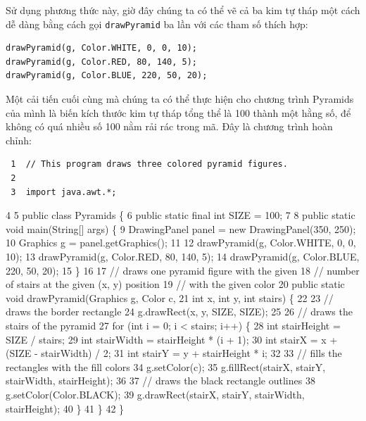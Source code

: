 Sử dụng phương thức này, giờ đây chúng ta có thể vẽ cả ba kim tự tháp
một cách dễ dàng bằng cách gọi \texttt{drawPyramid} ba lần với các tham
số thích hợp:

\begin{verbatim}
drawPyramid(g, Color.WHITE, 0, 0, 10);
drawPyramid(g, Color.RED, 80, 140, 5);
drawPyramid(g, Color.BLUE, 220, 50, 20);
\end{verbatim}

Một cải tiến cuối cùng mà chúng ta có thể thực hiện cho chương trình
Pyramids của mình là biến kích thước kim tự tháp tổng thể là 100 thành
một hằng số, để không có quá nhiều số 100 nằm rải rác trong mã. Đây là
chương trình hoàn chỉnh:

\begin{verbatim}
 1  // This program draws three colored pyramid figures.
 2
 3  import java.awt.*;
\end{verbatim}

4 5 public class Pyramids \{ 6 public static final int SIZE = 100; 7 8
public static void main(String{[}{]} args) \{ 9 DrawingPanel panel = new
DrawingPanel(350, 250); 10 Graphics g = panel.getGraphics(); 11 12
drawPyramid(g, Color.WHITE, 0, 0, 10); 13 drawPyramid(g, Color.RED, 80,
140, 5); 14 drawPyramid(g, Color.BLUE, 220, 50, 20); 15 \} 16 17 //
draws one pyramid figure with the given 18 // number of stairs at the
given (x, y) position 19 // with the given color 20 public static void
drawPyramid(Graphics g, Color c, 21 int x, int y, int stairs) \{ 22 23
// draws the border rectangle 24 g.drawRect(x, y, SIZE, SIZE); 25 26 //
draws the stairs of the pyramid 27 for (int i = 0; i \textless{} stairs;
i++) \{ 28 int stairHeight = SIZE / stairs; 29 int stairWidth =
stairHeight * (i + 1); 30 int stairX = x + (SIZE - stairWidth) / 2; 31
int stairY = y + stairHeight * i; 32 33 // fills the rectangles with the
fill colors 34 g.setColor(c); 35 g.fillRect(stairX, stairY, stairWidth,
stairHeight); 36 37 // draws the black rectangle outlines 38
g.setColor(Color.BLACK); 39 g.drawRect(stairX, stairY, stairWidth,
stairHeight); 40 \} 41 \} 42 \}

